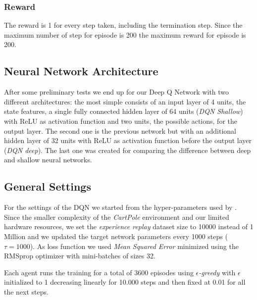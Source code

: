 \subsubsection{Reward}
The reward is 1 for every step taken, including the termination step. Since the maximum number of step for episode is 200 the maximum reward for episode is 200.


\subsection{Neural Network Architecture}

After some preliminary tests we end up for our Deep Q Network with two different architectures: the most simple consists of an input layer of 4 units, the state features, a single fully connected hidden layer of 64 units (\textit{DQN Shallow}) with ReLU as activation function and two units, the possible actions, for the output layer. The second one is the previous network but with an additional hidden layer of 32 units with ReLU as activation function before the output layer (\textit{DQN deep}). %
The last one was created for comparing the difference between deep and shallow neural networks.

\subsection{General Settings}

For the settings of the DQN we started from the hyper-parameters used by \citeauthor{Hasselt:2016:DRL:3016100.3016191} . Since the smaller complexity of the \textit{CartPole} environment and our limited hardware resources, we set the \textit{experience replay} dataset size  to 10000 instead of 1 Million and we updated the target network parameters every 1000 steps ($\tau = 1000$). As loss function we used \textit{Mean Squared Error} minimized using the RMSprop optimizer with mini-batches of sizes 32.

Each agent runs the training for a total of 3600 episodes using \textit{$\epsilon$-greedy} with $\epsilon$ initialized to 1 decreasing linearly for 10.000 steps and then fixed at 0.01 for all the next steps.

